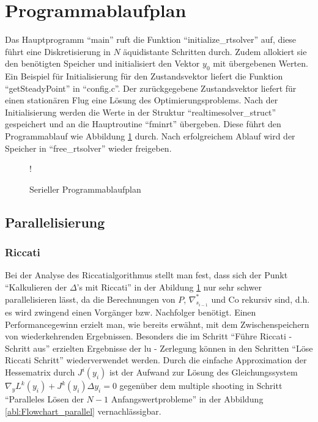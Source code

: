 \section{Programmablaufplan}\label{sec:ablauf}
Das Hauptprogramm ``main'' ruft die Funktion ``initialize\_rtsolver'' auf, diese führt eine Diskretisierung in $N$ äquidistante Schritten durch. Zudem allokiert sie den benötigten Speicher und initialisiert den Vektor $y_0$ mit übergebenen Werten. Ein Beispiel für Initialisierung für den Zustandsvektor liefert die Funktion ``getSteadyPoint'' in ``config.c''. Der zurückgegebene Zustandsvektor liefert für einen stationären Flug  eine Lösung des Optimierungsproblems. Nach der Initialisierung werden die Werte in der Struktur ``realtimesolver\_struct'' gespeichert und an die Hauptroutine ``fminrt'' übergeben. Diese führt den Programmablauf wie Abbildung \ref{abl:Flowchart_serial} durch. Nach erfolgreichem Ablauf wird der Speicher in ``free\_rtsolver'' wieder freigeben.

\begin{figure}[H]
\centering
\resizebox {0.7\columnwidth} {!} {
  
  \label{abl:Flowchart_serial}
}
\caption{Serieller Programmablaufplan}
\end{figure}

\subsection{Parallelisierung}\label{parallel}
\subsubsection{Riccati}
Bei der Analyse des Riccatialgorithmus stellt man fest, dass sich der Punkt ``Kalkulieren der $\Delta$'s mit Riccati'' in der Abildung \ref{abl:Flowchart_serial}  nur sehr schwer parallelisieren lässt, da die Berechnungen von $P$, $\nabla_{s_{i-1}}^{*}$ und Co rekursiv sind, d.h. es wird zwingend einen Vorgänger bzw. Nachfolger benötigt. Einen Performancegewinn erzielt man, wie bereits erwähnt, mit dem Zwischenspeichern von wiederkehrenden Ergebnissen. Besonders die im Schritt ``Führe Riccati - Schritt aus'' erzielten Ergebnisse der lu - Zerlegung können in den Schritten ``Löse Riccati Schritt'' wiederverwendet werden. Durch die einfache Approximation der Hessematrix durch $J^i(y_i)$ ist der Aufwand zur Lösung des Gleichungssystem $\nabla_{y} L^{k}(y_{i}) + J^{k}(y_{i}) \Delta y_{i} = 0$ gegenüber dem multiple shooting in Schritt ``Paralleles Lösen der $N-1$ Anfangswertprobleme'' in der Abbildung \ref{abl:Flowchart_parallel}  vernachlässigbar.
